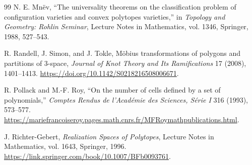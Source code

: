 \documentclass[11pt]{article}
\theoremstyle{remark}
\theoremstyle{plain}
\begin{document}
\begin{thebibliography}{99}
N. E. Mn\"ev,
``The universality theorems on the classification problem of configuration
varieties and convex polytopes varieties,''
in \emph{Topology and Geometry: Rohlin Seminar},
Lecture Notes in Mathematics, vol. 1346, Springer, 1988, 527--543.

R. Randell, J. Simon, and J. Tokle,
M\"obius transformations of polygons and partitions of \(3\)-space,
\emph{Journal of Knot Theory and Its Ramifications} 17 (2008), 1401--1413.
\url{https://doi.org/10.1142/S0218216508006671}.

R. Pollack and M.-F. Roy,
``On the number of cells defined by a set of polynomials,''
\emph{Comptes Rendus de l'Acad\'emie des Sciences, S\'erie I} 316 (1993),
573--577.
\url{https://mariefrancoiseroy.pages.math.cnrs.fr/MFRoymathpublications.html}.

J. Richter-Gebert,
\emph{Realization Spaces of Polytopes},
Lecture Notes in Mathematics, vol. 1643, Springer, 1996.
\url{https://link.springer.com/book/10.1007/BFb0093761}.

\end{thebibliography}
\end{document}
